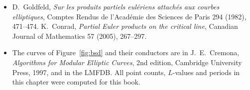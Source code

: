 \begin{itemize}
J.~Voight and M.~M.~Wood, \emph{A heuristic for boundedness of ranks of elliptic curves}, Journal of the European Mathematical Society 21 (2019),
2859--2903.
\item D.~Goldfeld, \emph{Sur les produits partiels eul\'eriens attach\'es aux courbes elliptiques}, Comptes Rendus de l'Acad\'emie des Sciences de Paris
294 (1982), 471--474. K.~Conrad, \emph{Partial Euler products on the critical line}, Canadian Journal of Mathematics 57 (2005), 267--297.
\item The curves of Figure~\ref{fig:bsd} and their conductors are in J.~E.~Cremona, \emph{Algorithms for Modular Elliptic Curves}, 2nd edition, Cambridge
University Press, 1997, and in the LMFDB. All point counts, $L$-values and periods in this chapter were computed for this book.
\end{itemize}
